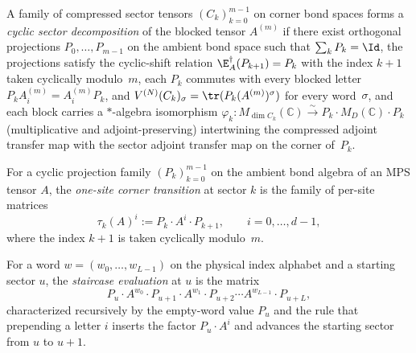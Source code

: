\begin{definition}%
    \label{def:cyclic_sector_decomp}
    \leanok
    A family of compressed sector tensors
    $(C_k)_{k=0}^{m-1}$ on corner bond spaces forms a \emph{cyclic sector
    decomposition} of the blocked tensor $A^{(m)}$ if there exist orthogonal
    projections $P_0,\dotsc,P_{m-1}$ on the ambient bond space such that
    $\sum_k P_k = \Id$, the projections satisfy the cyclic-shift relation
    $\E_A^\dagger(P_{k+1}) = P_k$ with the index $k+1$ taken cyclically
    modulo~$m$, each $P_k$ commutes with every blocked letter
    $P_k A^{(m)}_i = A^{(m)}_i P_k$, and
    $V^{(N)}(C_k)_\sigma = \tr(P_k (A^{(m)})^\sigma)$ for every word~$\sigma$,
    and each block carries a $\ast$-algebra isomorphism
    $\varphi_k : M_{\dim C_k}(\mathbb{C}) \xrightarrow{\sim}
        P_k \cdot M_D(\mathbb{C}) \cdot P_k$
    (multiplicative and adjoint-preserving) intertwining the compressed adjoint
    transfer map with the sector adjoint transfer map on the corner of~$P_k$.
\end{definition}

\begin{definition}%
    \label{def:corner_transition}
    \leanok
    For a cyclic projection family $(P_k)_{k=0}^{m-1}$ on the
    ambient bond algebra of an MPS tensor $A$, the \emph{one-site corner
    transition} at sector $k$ is the family of per-site matrices
    \[
        \tau_k(A)^i := P_k \cdot A^i \cdot P_{k+1}, \qquad i = 0,\ldots,d-1,
    \]
    where the index $k+1$ is taken cyclically modulo~$m$.
\end{definition}

\begin{definition}%
    \label{def:corner_eval_word}
    \leanok
    For a word $w = (w_0,\dotsc,w_{L-1})$ on the physical index alphabet and
    a starting sector $u$, the \emph{staircase evaluation} at $u$ is the matrix
    \[
        P_u \cdot A^{w_0} \cdot P_{u+1} \cdot A^{w_1} \cdot P_{u+2}
            \cdots A^{w_{L-1}} \cdot P_{u+L},
    \]
    characterized recursively by the empty-word value $P_u$ and the rule that
    prepending a letter $i$ inserts the factor $P_u \cdot A^i$ and advances the
    starting sector from $u$ to $u+1$.
\end{definition}

